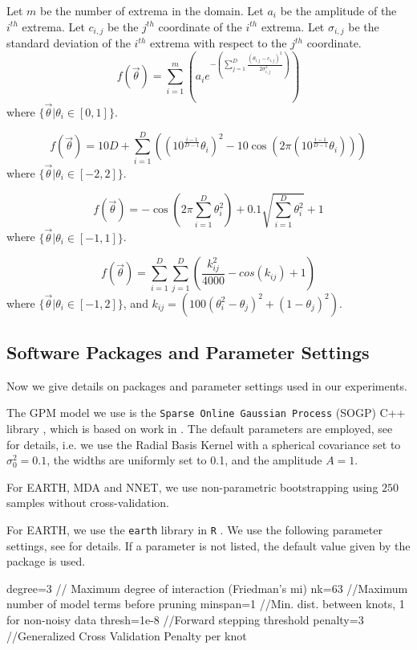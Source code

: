 Let $m$ be the number of extrema in the domain.
Let $a_i$ be the amplitude of the $i^{th}$ extrema.
Let $c_{i,j}$ be the $j^{th}$ coordinate of the $i^{th}$ extrema.
Let $\sigma_{i,j}$ be the standard deviation of the $i^{th}$ extrema with respect to the  $j^{th}$ coordinate.
$$
f(\vec{\theta}) = \sum_{i=1}^{m}\left(a_i e^{-\left(\sum_{j=1}^{D}\frac{\left(\theta_{i,j}-c_{i,j}\right)^2}{2\sigma_{i,j}^2}\right)}\right)
$$
where $\{\vec{\theta}|\theta_i\in [0,1]\}$.


$$
f(\vec{\theta}) = 10D + \sum_{i=1}^{D}\left((10^{\frac{i-1}{D-1}}\theta_i)^2 - 10\cos(2\pi(10^{\frac{i-1}{D-1}}\theta_i))\right)
$$
where
$\{\vec{\theta}|\theta_i\in [-2,2]\}$.


$$
f(\vec{\theta}) = -\cos\left(2\pi\sum_{i=1}^D\theta_i^2\right) + 0.1\sqrt{\sum_{i=1}^D\theta_i^2} + 1
$$
where $\{\vec{\theta}|\theta_i\in [-1,1]\}$.

$$
f(\vec{\theta}) = \sum_{i=1}^{D}\sum_{j=1}^{D}\left(\frac{k_{ij}^2}{4000} - cos(k_{ij}) + 1\right)
$$
where $\{\vec{\theta}|\theta_i\in [-1,2]\}$, and
$k_{ij} = (100(\theta_i^2-\theta_j)^2 + (1-\theta_j)^2)$.

\subsection{Software Packages and Parameter Settings}
\label{sec:package}

Now we give details on packages and parameter settings used in our experiments.

The GPM model we use is the \texttt{Sparse Online Gaussian Process} (SOGP) C++ library \cite{gpm}, which is based on work in \cite{Csato2002,CsatoOpper2002}.
%
The default parameters are employed, see~\cite{CsatoOpper2002} for details, i.e. we use the Radial Basis Kernel with a spherical covariance set to $\sigma_0^2 = 0.1$, the widths are uniformly set to 0.1, and the amplitude $A=1$.

For EARTH, MDA and NNET, we use non-parametric bootstrapping using $250$ samples without cross-validation.

For EARTH, we use the \texttt{earth} library in \texttt{R} \cite{earth}.
%
We use the following parameter settings, see \cite{earth} for details.
%
If a parameter is not listed, the default value given by the package is used.
%
\begin{code}
degree=3 // Maximum degree of interaction (Friedman's mi)
nk=63  //Maximum number of model terms before pruning
minspan=1 //Min. dist. between knots, 1 for non-noisy data
thresh=1e-8  //Forward stepping threshold
penalty=3 //Generalized Cross Validation Penalty per knot
\end{code}

